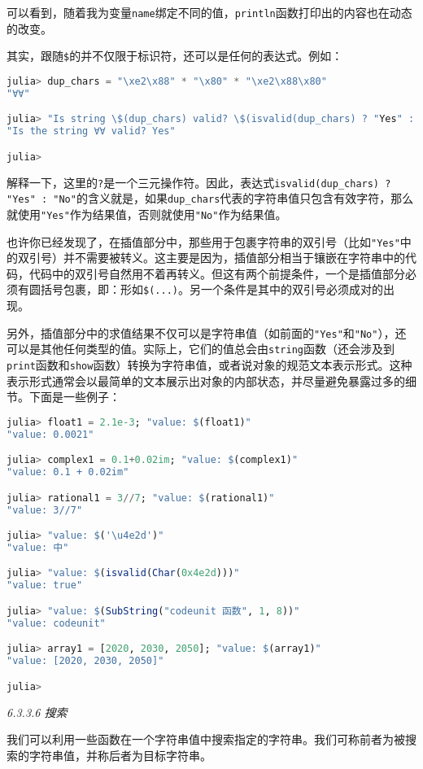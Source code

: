 可以看到，随着我为变量\verb|name|绑定不同的值，\verb|println|函数打印出的内容也在动态的改变。

其实，跟随\verb|$|的并不仅限于标识符，还可以是任何的表达式。例如：
\begin{lstlisting}[language=julia]
julia> dup_chars = "\xe2\x88" * "\x80" * "\xe2\x88\x80"
"∀∀"

julia> "Is string \$(dup_chars) valid? \$(isvalid(dup_chars) ? "Yes" : "No")"
"Is the string ∀∀ valid? Yes"

julia> 
\end{lstlisting}

解释一下，这里的\verb|?|是一个三元操作符。因此，表达式\verb|isvalid(dup_chars) ? "Yes" : "No"|的含义就是，如果\verb|dup_chars|代表的字符串值只包含有效字符，那么就使用\verb|"Yes"|作为结果值，否则就使用\verb|"No"|作为结果值。

也许你已经发现了，在插值部分中，那些用于包裹字符串的双引号（比如\verb|"Yes"|中的双引号）并不需要被转义。这主要是因为，插值部分相当于镶嵌在字符串中的代码，代码中的双引号自然用不着再转义。但这有两个前提条件，一个是插值部分必须有圆括号包裹，即：形如\verb|$(...)|。另一个条件是其中的双引号必须成对的出现。

另外，插值部分中的求值结果不仅可以是字符串值（如前面的\verb|"Yes"|和\verb|"No"|），还可以是其他任何类型的值。实际上，它们的值总会由\verb|string|函数（还会涉及到\verb|print|函数和\verb|show|函数）转换为字符串值，或者说对象的规范文本表示形式。这种表示形式通常会以最简单的文本展示出对象的内部状态，并尽量避免暴露过多的细节。下面是一些例子：
\begin{lstlisting}[language=julia]
julia> float1 = 2.1e-3; "value: $(float1)"
"value: 0.0021"

julia> complex1 = 0.1+0.02im; "value: $(complex1)"
"value: 0.1 + 0.02im"

julia> rational1 = 3//7; "value: $(rational1)"
"value: 3//7"

julia> "value: $('\u4e2d')"
"value: 中"

julia> "value: $(isvalid(Char(0x4e2d)))"
"value: true"

julia> "value: $(SubString("codeunit 函数", 1, 8))"
"value: codeunit"

julia> array1 = [2020, 2030, 2050]; "value: $(array1)"
"value: [2020, 2030, 2050]"

julia> 
\end{lstlisting}

\textsl{6.3.3.6 搜索}

我们可以利用一些函数在一个字符串值中搜索指定的字符串。我们可称前者为被搜索的字符串值，并称后者为目标字符串。

